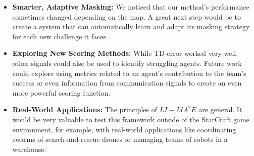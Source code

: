 \begin{itemize}
    \item \textbf{Smarter, Adaptive Masking:} We noticed that our method's performance sometimes changed depending on the map. A great next step would be to create a system that can automatically learn and adapt its masking strategy for each new challenge it faces.

    \item \textbf{Exploring New Scoring Methods:} While TD-error worked very well, other signals could also be used to identify struggling agents. Future work could explore using metrics related to an agent's contribution to the team's success or even information from communication signals to create an even more powerful scoring function.

    \item \textbf{Real-World Applications:} The principles of $LI-{MA}^2E$ are general. It would be very valuable to test this framework outside of the StarCraft game environment, for example, with real-world applications like coordinating swarms of search-and-rescue drones or managing teams of robots in a warehouse.
\end{itemize}